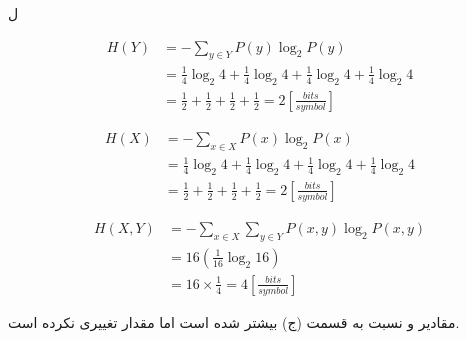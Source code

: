 \SubProblem
{ل}
{
\begin{equation*}
\begin{aligned}
    H(Y) &= -\sum_{y \in Y} P(y) \log_2 {P(y)}\\
    &= \frac{1}{4}\log_2 4 + \frac{1}{4}\log_2 4 + \frac{1}{4}\log_2 4 + \frac{1}{4}\log_2 4 \\
    &= \frac{1}{2} + \frac{1}{2} + \frac{1}{2} + \frac{1}{2} = 2 [\frac{bits}{symbol}]
\end{aligned}
\end{equation*}

\begin{equation*}
\begin{aligned}
    H(X) &= -\sum_{x \in X} P(x) \log_2 {P(x)}\\
    &= \frac{1}{4}\log_2 4 + \frac{1}{4}\log_2 4 + \frac{1}{4}\log_2 4 + \frac{1}{4}\log_2 4 \\
    &= \frac{1}{2} + \frac{1}{2} + \frac{1}{2} + \frac{1}{2} = 2 [\frac{bits}{symbol}]
\end{aligned}
\end{equation*}
    
\begin{equation*}
\begin{aligned}
    H(X,Y) &= -\sum_{x \in X}\sum_{y \in Y} P(x,y) \log_2 {P(x,y)}\\
    &= 16(\frac{1}{16}\log_2 16) \\
    &= 16 \times \frac{1}{4} = 4 [\frac{bits}{symbol}]
\end{aligned}
\end{equation*}

    مقادیر 
    و
    نسبت به قسمت (ج) بیشتر شده است اما مقدار
    تغییری نکرده است.
}